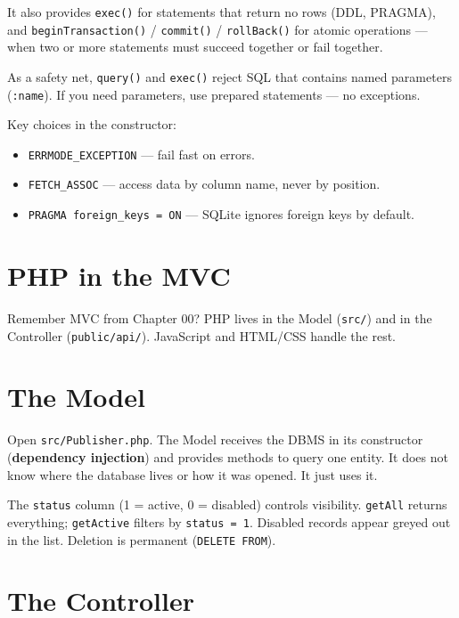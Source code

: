 \documentclass[11pt,a4paper,oneside]{book}
\providecommand{\tightlist}{%
  \setlength{\itemsep}{0pt}\setlength{\parskip}{0pt}}
\begin{document}
It also provides \texttt{exec()} for statements that return no
rows (DDL, PRAGMA), and \texttt{beginTransaction()} /
\texttt{commit()} / \texttt{rollBack()} for atomic operations ---
when two or more statements must succeed together or fail
together.

As a safety net, \texttt{query()} and \texttt{exec()} reject SQL
that contains named parameters (\texttt{:name}). If you need
parameters, use prepared statements --- no exceptions.

Key choices in the constructor:

\begin{itemize}
\tightlist
\item
  \texttt{ERRMODE\_EXCEPTION} --- fail fast on errors.
\item
  \texttt{FETCH\_ASSOC} --- access data by column name, never by
  position.
\item
  \texttt{PRAGMA\ foreign\_keys\ =\ ON} --- SQLite ignores
  foreign keys by default.
\end{itemize}

\hypertarget{php-in-the-mvc}{%
\section{PHP in the MVC}\label{php-in-the-mvc}}

Remember MVC from Chapter 00? PHP lives in the Model
(\texttt{src/}) and in the Controller (\texttt{public/api/}).
JavaScript and HTML/CSS handle the rest.

\hypertarget{the-model}{%
\clearpage
\section{The Model}\label{the-model}}

Open \texttt{src/Publisher.php}. The Model receives the DBMS in
its constructor (\textbf{dependency injection}) and provides
methods to query one entity. It does not know where the database
lives or how it was opened. It just uses it.

The \texttt{status} column (1 = active, 0 = disabled) controls
visibility. \texttt{getAll} returns everything;
\texttt{getActive} filters by \texttt{status\ =\ 1}. Disabled
records appear greyed out in the list. Deletion is permanent
(\texttt{DELETE\ FROM}).

\hypertarget{the-controller}{%
\section{The Controller}\label{the-controller}}
\end{document}
